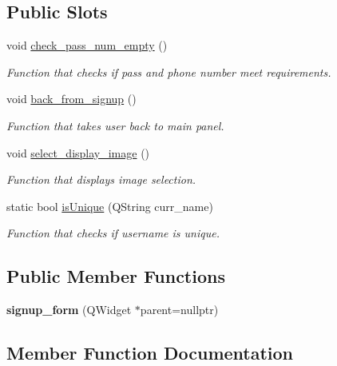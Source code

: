 \subsection*{Public Slots}
\begin{DoxyCompactItemize}
\item 
void \hyperlink{classsignup__form_a8d618167178f15d27937127a4a0efbc1}{check\+\_\+pass\+\_\+num\+\_\+empty} ()
\begin{DoxyCompactList}\small\item\em Function that checks if pass and phone number meet requirements. \end{DoxyCompactList}\item 
void \hyperlink{classsignup__form_a8fb6be94fb91979a3da75be5e123c4e7}{back\+\_\+from\+\_\+signup} ()
\begin{DoxyCompactList}\small\item\em Function that takes user back to main panel. \end{DoxyCompactList}\item 
void \hyperlink{classsignup__form_a919a6d06a8b45ec3672341d840572a0f}{select\+\_\+display\+\_\+image} ()
\begin{DoxyCompactList}\small\item\em Function that displays image selection. \end{DoxyCompactList}\item 
static bool \hyperlink{classsignup__form_aa1378656be593cc119db637e317a699c}{is\+Unique} (Q\+String curr\+\_\+name)
\begin{DoxyCompactList}\small\item\em Function that checks if username is unique. \end{DoxyCompactList}\end{DoxyCompactItemize}
\subsection*{Public Member Functions}
\begin{DoxyCompactItemize}
\item 
\mbox{\label{classsignup__form_a3f0b23c1cc03c4c3800b9922716ffb35}} 
{\bfseries signup\+\_\+form} (Q\+Widget $\ast$parent=nullptr)
\end{DoxyCompactItemize}


\subsection{Member Function Documentation}
\mbox{\label{classsignup__form_a8fb6be94fb91979a3da75be5e123c4e7}} 
